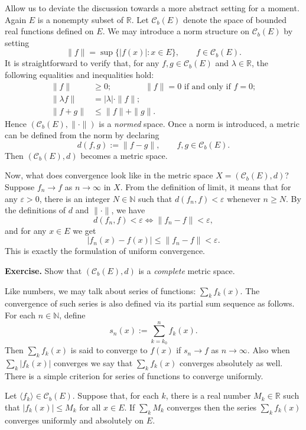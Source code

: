 \documentclass[11pt]{article}
\begin{document}
Allow us to deviate the discussion towards a more abstract setting for a moment.
Again $E$ is a nonempty subset of $\mathbb{R}$.
Let $\mathcal{C}_b(E)$ denote the space of bounded real functions defined on $E$.
We may introduce a norm structure on $\mathcal{C}_b(E)$ by setting
\[
  \| f \| = \sup \{ |f(x)| \colon x \in E \}, \qquad f \in \mathcal{C}_b(E).
\]
It is straightforward to verify that, for any $f, g \in \mathcal{C}_b(E)$ and $\lambda \in \mathbb{R}$, the following equalities and inequalities hold:
\begin{align*}
  \| f \| &\geqslant 0; \qquad\qquad \| f \| = 0 \text{ if and only if } f = 0; \\
  \| \lambda f \| &= |\lambda| \cdot \| f \|; \\
  \| f + g \| &\leqslant \| f \| + \| g \|.
\end{align*}
Hence $(\mathcal{C}_b(E), \| \cdot \|)$ is a \textit{normed} space.
Once a norm is introduced, a metric can be defined from the norm by declaring
\[
  d(f, g) := \| f - g \|, \qquad f, g \in \mathcal{C}_b(E).
\]
Then $(\mathcal{C}_b(E), d)$ becomes a metric space.

Now, what does convergence look like in the metric space $X = (\mathcal{C}_b(E), d)$?
Suppose $f_n \to f$ as $n \to \infty$ in $X$.
From the definition of limit, it means that for any $\varepsilon > 0$, there is an integer $N \in \mathbb{N}$ such that $d(f_n, f) < \varepsilon$ whenever $n \geqslant N$.  By the definitions of $d$ and $\| \cdot \|$, we have
\[
  d(f_n, f) < \varepsilon \iff \| f_n - f \| < \varepsilon,
\]
and for any $x \in E$ we get
\[
  |f_n(x) - f(x)| \leqslant \| f_n - f \| < \varepsilon.
\]
This is exactly the formulation of uniform convergence.

\medskip
\noindent\textbf{Exercise.} Show that $(\mathcal{C}_b(E), d)$ is a \textit{complete} metric space.

Like numbers, we may talk about series of functions: $\sum_k f_k(x)$.
The convergence of such series is also defined via its partial sum sequence as follows.  For each $n \in \mathbb{N}$, define
\[
  s_n(x) := \sum_{k = k_0}^n f_k(x).
\]
Then $\sum_k f_k(x)$ is said to converge to $f(x)$ if $s_n \to f$ as $n \to \infty$.
Also when $\sum_k |f_k(x)|$ converges we say that $\sum_k f_k(x)$ converges absolutely as well.
There is a simple criterion for series of functions to converge uniformly.

\begin{thm}
  Let $\langle f_k \rangle \in \mathcal{C}_b(E)$.
  Suppose that, for each $k$, there is a real number $M_k \in \mathbb{R}$ such that $|f_k(x)| \leqslant M_k$ for all $x \in E$.
  If $\sum_k M_k$ converges then the series $\sum_k f_k(x)$ converges uniformly and absolutely on $E$.
\end{thm}
\end{document}
